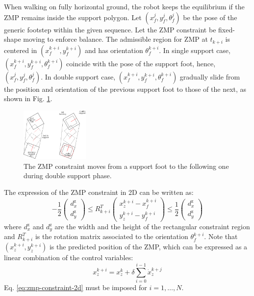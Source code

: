 When walking on fully horizontal ground, the robot keeps the equilibrium 
if the ZMP remains inside the support polygon. Let
$(x_f^j, y_f^j, \theta_f^j)$ be the pose of the 
generic footstep within the given sequence.
Let the ZMP constraint be fixed-shape moving \cite{aboudonia17} to
enforce balance. The admissible region for ZMP at $t_{k+i}$ is centered in 
$(x_f^{k+i}, y_f^{k+i})$ and has orientation $\theta_f^{k+i}$.
In single support case, $(x_f^{k+i}, y_f^{k+i}, \theta_f^{k+i})$ coincide with
the pose of the support foot, hence, $(x_f^j, y_f^j, \theta_f^j)$.
In double support case, $(x_f^{k+i}, y_f^{k+i}, \theta_f^{k+i})$ gradually
slide from the position 
and orientation of the previous support foot to those of the next, as shown 
in Fig. \ref{fig:double-support}. 
\begin{figure}
    \centering
    \includegraphics[width=0.3\textwidth]{figures/double_support.pdf}
    \caption{The ZMP constraint moves from a support foot to the following 
        one during double support phase.}
    \label{fig:double-support}
\end{figure}
The expression of the ZMP constraint in 2D can be written as:
\begin{equation}
  \label{eq:zmp-constraint-2d}
  -\frac{1}{2}
  \begin{pmatrix}
    d_x^\text{z} \\
    d_y^\text{z}
  \end{pmatrix}
  \le
  R_{k+i}^T
  \begin{pmatrix}
    x_z^{k+i} - x_f^{k+i} \\
    y_z^{k+i} - y_f^{k+i}
  \end{pmatrix}
  \le
  \frac{1}{2}
  \begin{pmatrix}
    d_x^\text{z} \\
    d_y^\text{z}
  \end{pmatrix}
\end{equation}
where $d_x^\text{z}$ and $d_y^\text{z}$ are the width and the height of the
rectangular constraint region and $R_{k+i}^T$ is the rotation matrix associated
to the orientation $\theta_f^{k+i}$.
Note that $(x_z^{k+i}, y_z^{k+i})$ is the predicted position
of the ZMP, which can be expressed as a linear combination of the control
variables:
\begin{equation}
  \label{eq:piecewise-linear-zmp-trajectory}
  x_z^{k+i} = x_z^k + \delta \sum_{i=0}^{i-1} \dot{x}_z^{k+j}
\end{equation}
Eq. \eqref{eq:zmp-constraint-2d} must be imposed for $i = 1, \dots, N$.

